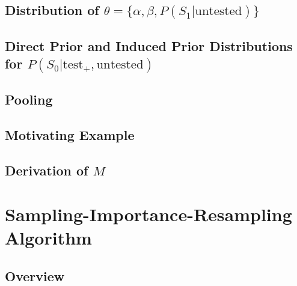 \documentclass[12pt,twoside]{smiththesis}
\begin{document}
\hypertarget{distribution-of-theta-alpha-beta-ps_1textuntested}{%
\subsection{\texorpdfstring{Distribution of \(\theta = \{\alpha, \beta, P(S_1|\text{untested}) \}\)}{Distribution of \textbackslash theta = \textbackslash\{\textbackslash alpha, \textbackslash beta, P(S\_1\textbar\textbackslash text\{untested\}) \textbackslash\}}}\label{distribution-of-theta-alpha-beta-ps_1textuntested}}

\hypertarget{direct-prior-and-induced-prior-distributions-for-ps_0texttest_textuntested}{%
\subsection{\texorpdfstring{Direct Prior and Induced Prior Distributions for \(P(S_0|\text{test}_+,\text{untested})\)}{Direct Prior and Induced Prior Distributions for P(S\_0\textbar\textbackslash text\{test\}\_+,\textbackslash text\{untested\})}}\label{direct-prior-and-induced-prior-distributions-for-ps_0texttest_textuntested}}

\hypertarget{pooling}{%
\subsection{Pooling}\label{pooling}}

\hypertarget{motivating-example}{%
\subsection{Motivating Example}\label{motivating-example}}

\hypertarget{derivation}{%
\subsection{\texorpdfstring{Derivation of \(M\)}{Derivation of M}}\label{derivation}}

\hypertarget{sampling}{%
\section{Sampling-Importance-Resampling Algorithm}\label{sampling}}

\hypertarget{overview}{%
\subsection{Overview}\label{overview}}
\end{document}

